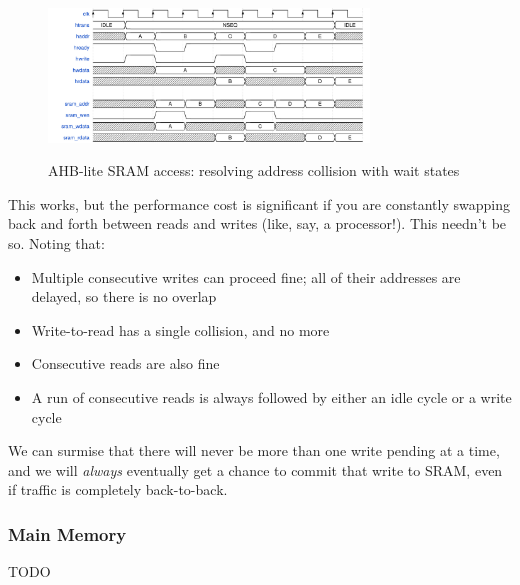 \begin{figure}[H]
\centering
\caption{AHB-lite SRAM access: resolving address collision with wait states}
\includegraphics[width=0.76\textwidth]{waves/sync_sram_ahb_stall.pdf}
\label{diagram:sync_sram_ahb_stall}
\end{figure}

This works, but the performance cost is significant if you are constantly swapping back and forth between reads and writes (like, say, a processor!). This needn't be so. Noting that:

\begin{itemize}
	\item Multiple consecutive writes can proceed fine; all of their addresses are delayed, so there is no overlap
	\item Write-to-read has a single collision, and no more
	\item Consecutive reads are also fine
	\item A run of consecutive reads is always followed by either an idle cycle or a write cycle
\end{itemize}

We can surmise that there will never be more than one write pending at a time, and we will {\it always} eventually get a chance to commit that write to SRAM, even if traffic is completely back-to-back.

\subsubsection{Main Memory}

TODO